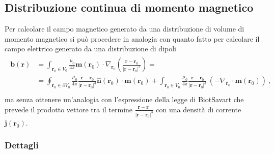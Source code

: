 \documentclass[letterpaper,10pt,italian]{jupyterBook}
\begin{document}
\subsection{Distribuzione continua di momento magnetico}
\label{\detokenize{ch/media:distribuzione-continua-di-momento-magnetico}}
\sphinxAtStartPar
Per calcolare il campo magnetico generato da una distribuzione di volume di momento magnetico si può procedere in analogia con quanto fatto per calcolare il campo elettrico generato da una distribuzione di dipoli
\begin{equation*}
\begin{split}\begin{aligned}
\mathbf{b}(\mathbf{r})
  & = \int_{\mathbf{r}_0 \in V_0} \frac{\mu_0}{4 \pi } \mathbf{m}(\mathbf{r}_0) \cdot \nabla_{\mathbf{r}_0}  \left( \frac{\mathbf{r} - \mathbf{r}_0}{|\mathbf{r} - \mathbf{r}_0|^3} \right) = \\
  & = \oint_{\mathbf{r}_0 \in \partial V_0} \frac{\mu_0}{4 \pi}  \frac{\mathbf{r} - \mathbf{r}_0}{|\mathbf{r} - \mathbf{r}_0|^3} \hat{\mathbf{n}}(\mathbf{r}_0) \cdot \mathbf{m}(\mathbf{r}_0) + \int_{\mathbf{r}_0 \in V_0} \frac{\mu_0}{4 \pi} \frac{\mathbf{r} - \mathbf{r}_0}{|\mathbf{r} - \mathbf{r}_0|^3} \,\left( - \nabla_{\mathbf{r}_0} \cdot \mathbf{m}(\mathbf{r}_0) \right) \ , \\
\end{aligned}\end{split}
\end{equation*}
\sphinxAtStartPar
ma senza ottenere un’analogia con l’espressione della legge di Biot\sphinxhyphen{}Savart che prevede il prodotto vettore tra il termine \(\frac{\mathbf{r}- \mathbf{r}_0}{|\mathbf{r} - \mathbf{r}_0|^3}\) con una densità di corrente \(\mathbf{j}(\mathbf{r}_0)\).
\subsubsection*{Dettagli}
\end{document}
